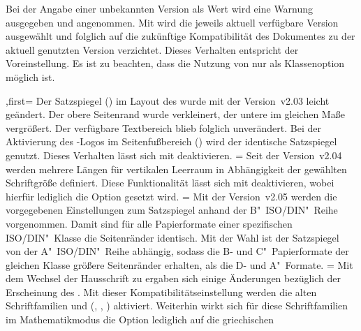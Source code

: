 \begin{DeclareEntity*}{}
\begin{DeclareEntity*}{}
\begin{DeclareEntity*}{}
\begin{Declaration}
Bei der Angabe einer unbekannten Version als Wert wird eine Warnung ausgegeben 
und  angenommen. Mit  wird die 
jeweils aktuell verfügbare Version ausgewählt und folglich auf die zukünftige 
Kompatibilität des Dokumentes zu der aktuell genutzten Version verzichtet. 
Dieses Verhalten entspricht der Voreinstellung. Es ist zu beachten, dass die 
Nutzung von  nur als Klassenoption möglich ist.
\begin{DeclareValues}
,first=
  Der Satzspiegel () im Layout des 
  \CDs wurde mit der Version~v2.03 leicht geändert. Der obere Seitenrand wurde 
  verkleinert, der untere im gleichen Maße vergrößert. Der verfügbare 
  Textbereich blieb folglich unverändert. Bei der Aktivierung des \DDC-Logos im 
  Seitenfußbereich () wird der 
  identische Satzspiegel genutzt. Dieses Verhalten lässt sich mit 
   deaktivieren.
=
  Seit der Version~v2.04 werden mehrere Längen für vertikalen Leerraum in 
  Abhängigkeit der gewählten Schriftgröße definiert. Diese Funktionalität lässt 
  sich mit  deaktivieren, wobei hierfür lediglich die 
  Option  gesetzt wird. 
=
  Mit der Version~v2.05 werden die vorgegebenen Einstellungen zum Satzspiegel 
  anhand der B"~ISO/DIN"~Reihe vorgenommen. Damit sind für alle Papierformate 
  einer spezifischen ISO/DIN"~Klasse die Seitenränder identisch. Mit der Wahl 
   ist der Satzspiegel von der A"~ISO/DIN"~Reihe 
  abhängig, sodass die B- und C"~Papierformate der gleichen Klasse größere 
  Seitenränder erhalten, als die D- und A"~Formate.
=
  Mit dem Wechsel der Hausschrift zu \OpenSans ergaben sich einige Änderungen 
  bezüglich der Erscheinung des \CDs. Mit dieser Kompatibilitätseinstellung 
  werden die alten Schriftfamilien \Univers und \DIN 
  (, , )
  aktiviert. Weiterhin wirkt sich für diese Schriftfamilien im Mathematikmodus 
  die Option  lediglich auf die griechischen 

\end{DeclareValues}
\end{Declaration}
\end{DeclareEntity*}
\end{DeclareEntity*}
\end{DeclareEntity*}
